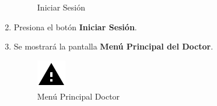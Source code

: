 \begin{enumerate}
\begin{figure}[!htbp]
\begin{center}
			\caption{Iniciar Sesión}
			\label{fig:IniciarSesion2}
		\end{center}
	\end{figure}

	\item Presiona el botón \textbf{Iniciar Sesión}.
	
	\item Se mostrará la pantalla \textbf{Menú Principal del Doctor}.
	\newpage
		\begin{figure}[!htbp]			\hypertarget{fig:mpDoctor}{\hspace{1pt}}
		\begin{center}
			\includegraphics[height=0.4\textheight]{images/Iconos/Advertencia}
			\caption{Menú Principal Doctor}
			\label{fig:mpDoctor}
		\end{center}
	\end{figure}


\end{enumerate}

